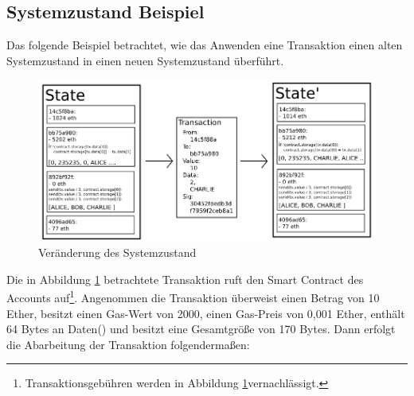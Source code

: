 \subsection{Systemzustand Beispiel}
Das folgende Beispiel betrachtet, wie das Anwenden eine Transaktion einen alten Systemzustand in einen neuen Systemzustand überführt. 
\begin{figure}[H]
\centering
\includegraphics[width=1\linewidth]{Figures/eth/ETH_statetransition_example}
\decoRule
\caption{Veränderung des Systemzustand}
\label{fig:ETH_statetransition_example}
\end{figure}
Die in Abbildung \ref{fig:ETH_statetransition_example} betrachtete Transaktion ruft den Smart Contract des Accounts  auf\footnote{Transaktionsgebühren werden in Abbildung \ref{fig:ETH_statetransition_example}vernachlässigt.}. Angenommen die Transaktion überweist einen Betrag von 10 Ether, besitzt einen Gas-Wert von 2000, einen Gas-Preis von 0,001 Ether, enthält 64 Bytes an Daten() und besitzt eine Gesamtgröße von 170 Bytes. Dann erfolgt die Abarbeitung der Transaktion folgendermaßen:
